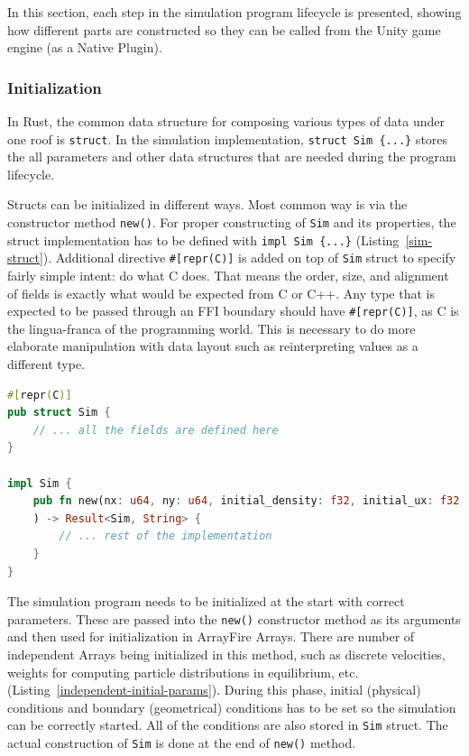 In this section, each step in the simulation program lifecycle is presented, showing how different parts are constructed so they can be called from the Unity game engine (as a Native Plugin).

\subsubsection{Initialization}\label{sec:lbm-initialization}
In Rust, the common data structure for composing various types of data under one roof is \texttt{struct}. In the simulation implementation, \texttt{struct Sim \{...\}} stores the all parameters and other data structures that are needed during the program lifecycle. 

Structs can be initialized in different ways. Most common way is via the constructor method \texttt{new()}. For proper constructing of \texttt{Sim} and its properties, the struct implementation has to be defined with \texttt{impl Sim \{...\}} (Listing~\ref{sim-struct}). Additional directive \texttt{\#[repr(C)]} is added on top of \texttt{Sim} struct to specify fairly simple intent: do what C does. That means the order, size, and alignment of fields is exactly what would be expected from C or C++. Any type that is expected to be passed through an FFI boundary should have \texttt{\#[repr(C)]}, as C is the lingua-franca of the programming world. This is necessary to do more elaborate manipulation with data layout such as reinterpreting values as a different type.

\begin{lstlisting}[language=Rust, caption=Implementation of Sim struct with constructor method., label=sim-struct]
#[repr(C)]
pub struct Sim {
	// ... all the fields are defined here
}

impl Sim {
	pub fn new(nx: u64, ny: u64, initial_density: f32, initial_ux: f32, omega: f32, obstacle_x: u64, obstacle_y: u64, obstacle_r: u64
	) -> Result<Sim, String> {
		// ... rest of the implementation
	}
}
\end{lstlisting}

The simulation program needs to be initialized at the start with correct parameters. These are passed into the \texttt{new()} constructor method as its arguments and then used for initialization in ArrayFire Arrays. There are number of independent Arrays being initialized in this method, such as discrete velocities, weights for computing particle distributions in equilibrium, etc. (Listing~\ref{independent-initial-params}). During this phase, initial (physical) conditions and boundary (geometrical) conditions has to be set so the simulation can be correctly started. All of the conditions are also stored in \texttt{Sim} struct. The actual construction of \texttt{Sim} is done at the end of \texttt{new()} method.

